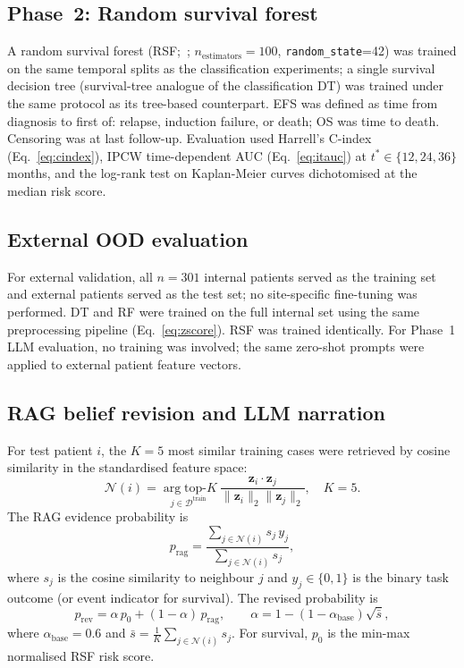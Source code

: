 \documentclass[pdflatex,sn-nature]{sn-jnl}
\begin{document}
\subsection{Phase~2: Random survival forest}\label{sec:rsf}

A random survival forest (RSF;~\cite{[CITE:Ishwaran2008]};
$n_\text{estimators}=100$, \texttt{random\_state}=42) was trained on
the same temporal splits as the classification experiments; a single
survival decision tree (survival-tree analogue of the classification DT)
was trained under the same protocol as its tree-based counterpart.
EFS was defined as time from diagnosis to first of: relapse, induction
failure, or death; OS was time to death.
Censoring was at last follow-up.
Evaluation used Harrell's C-index (Eq.~\ref{eq:cindex}), IPCW
time-dependent AUC (Eq.~\ref{eq:itauc}) at $t^*\in\{12,24,36\}$
months, and the log-rank test on Kaplan-Meier curves dichotomised at
the median risk score.

\subsection{External OOD evaluation}\label{sec:ood}

For external validation, all $n=301$ internal patients served as the
training set and external patients served as the test set; no
site-specific fine-tuning was performed.
DT and RF were trained on the full internal set using the same
preprocessing pipeline (Eq.~\ref{eq:zscore}).
RSF was trained identically.
For Phase~1 LLM evaluation, no training was involved; the same
zero-shot prompts were applied to external patient feature vectors.

\subsection{RAG belief revision and LLM narration}\label{sec:rag_methods}

For test patient $i$, the $K=5$ most similar training cases were
retrieved by cosine similarity in the standardised feature space:
\begin{equation}
\mathcal{N}(i) = \underset{j \in \mathcal{D}^{\text{train}}}
  {\arg\text{top-}K}\
  \frac{\mathbf{z}_i \cdot \mathbf{z}_j}
       {\|\mathbf{z}_i\|_2 \|\mathbf{z}_j\|_2}, \quad K = 5.
\label{eq:rag}
\end{equation}
The RAG evidence probability is
\begin{equation}
p_{\text{rag}} =
  \frac{\sum_{j \in \mathcal{N}(i)} s_j\, y_j}
       {\sum_{j \in \mathcal{N}(i)} s_j},
\label{eq:prag}
\end{equation}
where $s_j$ is the cosine similarity to neighbour $j$ and
$y_j \in \{0,1\}$ is the binary task outcome (or event indicator
for survival).
The revised probability is
\begin{equation}
p_{\text{rev}} = \alpha\, p_0 + (1-\alpha)\, p_{\text{rag}},
\qquad
\alpha = 1 - (1-\alpha_{\text{base}})\sqrt{\bar{s}},
\label{eq:prev}
\end{equation}
where $\alpha_\text{base}=0.6$ and
$\bar{s} = \frac{1}{K}\sum_{j \in \mathcal{N}(i)} s_j$.
For survival, $p_0$ is the min-max normalised RSF risk score.
\end{document}
